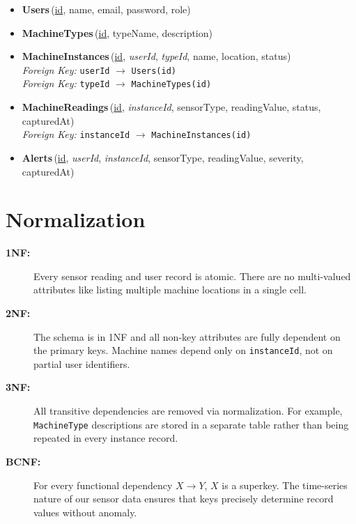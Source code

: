 \documentclass[12pt, a4paper]{article}
\begin{document}
\begin{itemize}
    \item \textbf{Users}\,(\underline{id}, name, email, password, role)
    \item \textbf{MachineTypes}\,(\underline{id}, typeName, description)
    \item \textbf{MachineInstances}\,(\underline{id}, \textit{userId}, \textit{typeId}, name, location, status) \\
          \hspace*{1em}\textit{Foreign Key:} \texttt{userId} $\to$ \texttt{Users(id)} \\
          \hspace*{1em}\textit{Foreign Key:} \texttt{typeId} $\to$ \texttt{MachineTypes(id)}
    \item \textbf{MachineReadings}\,(\underline{id}, \textit{instanceId}, sensorType, readingValue, status, capturedAt) \\
          \hspace*{1em}\textit{Foreign Key:} \texttt{instanceId} $\to$ \texttt{MachineInstances(id)}
    \item \textbf{Alerts}\,(\underline{id}, \textit{userId}, \textit{instanceId}, sensorType, readingValue, severity, capturedAt)
\end{itemize}

\section{Normalization}
\begin{description}
    \item[\textbf{1NF:}] Every sensor reading and user record is atomic. There are no multi-valued attributes like listing multiple machine locations in a single cell.
    \item[\textbf{2NF:}] The schema is in 1NF and all non-key attributes are fully dependent on the primary keys. Machine names depend only on \texttt{instanceId}, not on partial user identifiers.
    \item[\textbf{3NF:}] All transitive dependencies are removed via normalization. For example, \texttt{MachineType} descriptions are stored in a separate table rather than being repeated in every instance record.
    \item[\textbf{BCNF:}] For every functional dependency $X \rightarrow Y$, $X$ is a superkey. The time-series nature of our sensor data ensures that keys precisely determine record values without anomaly.
\end{description}
\end{document}
